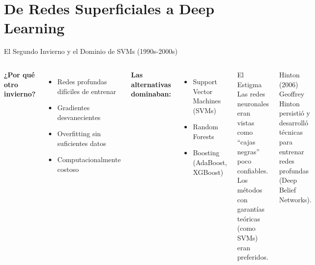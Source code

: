 \documentclass[aspectratio=169]{beamer}
\begin{document}
\section{De Redes Superficiales a Deep Learning}

\begin{frame}{El Segundo Invierno y el Dominio de SVMs (1990s-2000s)}
    \begin{columns}
        \textbf{¿Por qué otro invierno?}
        \begin{itemize}
            \item Redes profundas difíciles de entrenar
            \item Gradientes desvanecientes
            \item Overfitting sin suficientes datos
            \item Computacionalmente costoso
        \end{itemize}
        
        \vspace{0.3cm}
        \textbf{Las alternativas dominaban:}
        \begin{itemize}
            \item Support Vector Machines (SVMs)
            \item Random Forests
            \item Boosting (AdaBoost, XGBoost)
        \end{itemize}
        
        \begin{alertblock}{El Estigma}
            Las redes neuronales eran vistas como ``cajas negras'' poco confiables. Los métodos con garantías teóricas (como SVMs) eran preferidos.
        \end{alertblock}
        
        \vspace{0.2cm}
        \begin{exampleblock}{Hinton (2006)}
            Geoffrey Hinton persistió y desarrolló técnicas para entrenar redes profundas (Deep Belief Networks).
        \end{exampleblock}
    \end{columns}
\end{frame}
\end{document}
